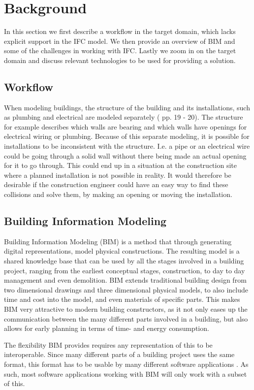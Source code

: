 \section{Background}
In this section we first describe a workflow in the target domain, which lacks explicit support in the IFC model. We then provide an overview of BIM and some of the challenges in working with IFC. Lastly we zoom in on the target domain and discuss relevant technologies to be used for providing a solution.
\subsection{Workflow}
\label{sec:workflow}
When modeling buildings, the structure of the building and its installations, such as plumbing and electrical are modeled separately (\cite{jorgensen10} pp. 19 - 20). The structure for example describes which walls are bearing and which walls have openings for electrical wiring or plumbing.  Because of this separate modeling, it is possible for installations to be inconsistent with the structure. I.e. a pipe or an electrical wire could be going through a solid wall without there being made an actual opening for it to go through. This could end up in a situation at the construction site where a planned installation is not possible in reality. It would therefore be desirable if the construction engineer could have an easy way to find these collisions and solve them, by making an opening or moving the installation\cite{jorgensen12}.
\subsection{Building Information Modeling}
\label{sec:building_information_modeling}
Building Information Modeling (BIM) is a method that through generating digital representations, model physical constructions. The resulting model is a shared knowledge base that can be used by all the stages involved in a building project, ranging from the earliest conceptual stages, construction, to day to day management and even demolition. BIM extends traditional building design from two dimensional drawings and three dimensional physical models, to also include time and cost into the model, and even materials of specific parts. This makes BIM very attractive to modern building constructors, as it not only eases up the communication between the many different parts involved in a building, but also allows for early planning in terms of time- and energy consumption.

The flexibility BIM provides requires any representation of this to be interoperable. Since many different parts of a building project uses the same format, this format has to be usable by many different software applications \cite{quteprints37725}. As such, most software applications working with BIM will only work with a subset of this.
